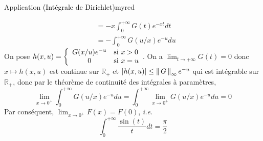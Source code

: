 \begin{omed}{Application \textcolor{black}{(Intégrale de Dirichlet)}}{myred}
\begin{itemize}
\begin{align*}
                &= -x \int_{0}^{+\infty} G(t) e^{-xt} dt \\
                &= - \int_{0}^{+\infty} G(u/x) e^{-u} du 
            \end{align*}
            On pose $h(x,u) = \sisi{G(x/u) e^{-u}}{x > 0}{0}{x = u}$. On a $\lim_{t \to +\infty} G(t) = 0$ donc $x \mapsto h(x,u)$ est continue sur $\mathbb{R}_+$ et $\left\lvert h(x,u)\right\rvert \leq \left\lVert\,G\,\right\rVert_{\infty} e^{-u}$ qui est intégrable sur $\mathbb{R}_+$, donc par le théorème de continuité des intégrales à paramètres, 
            \[ \lim_{x \to 0^+} \int_{0}^{+\infty} G(u/x) e^{-u} du = \int_{0}^{+\infty} \lim_{x \to 0^+} G(u/x) e^{-u} du = 0 \]   
            Par conséquent, $\lim_{x \to 0^+} F(x) = F(0)$, \textit{i.e.} 
            \[ \int_{0}^{+\infty} \frac{\sin(t)}{t} dt = \frac{\pi}{2} \]  
        \end{itemize}
    \end{omed}

